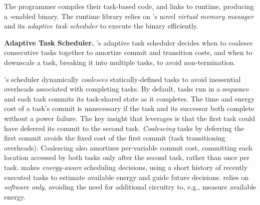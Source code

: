 The programmer compiles their task-based code, and links to \sys runtime,
producing a \sys-enabled binary. The runtime library relies on \sys's novel
{\em virtual memory manager} and its {\em adaptive task scheduler} to execute the binary 
efficiently. 

\textbf{Adaptive Task Scheduler.} 
\sys's adaptive task scheduler decides when to coalesce consecutive tasks
together to amortize commit and transition costs, and when to downscale a task,
breaking it into multiple tasks, to avoid non-termination.

\sys's scheduler dynamically {\em coalesces} statically\hyp{}defined tasks to
avoid inessential overheads associated with completing tasks. By default, tasks
run in a sequence and each task commits its task-shared state as it completes.
The time and energy cost of a task's commit is unnecessary if the task and its
successor both complete without a power failure. The key insight that \sys
leverages is that the first task could have deferred its commit to the second
task. {\em Coalescing} tasks by deferring the first commit avoids the fixed
cost of the first commit (task transitioning overheads). Coalescing also
amortizes per-variable commit cost, committing each location accessed by both
tasks only after the second task, rather than once per task.  \sys makes
\emph{energy-aware} scheduling decisions, using a short history of recently
executed tasks to estimate available energy and guide future decisions. \sys
relies on {\em software only}, avoiding the need for additional circuitry to,
e.g., measure available energy.


